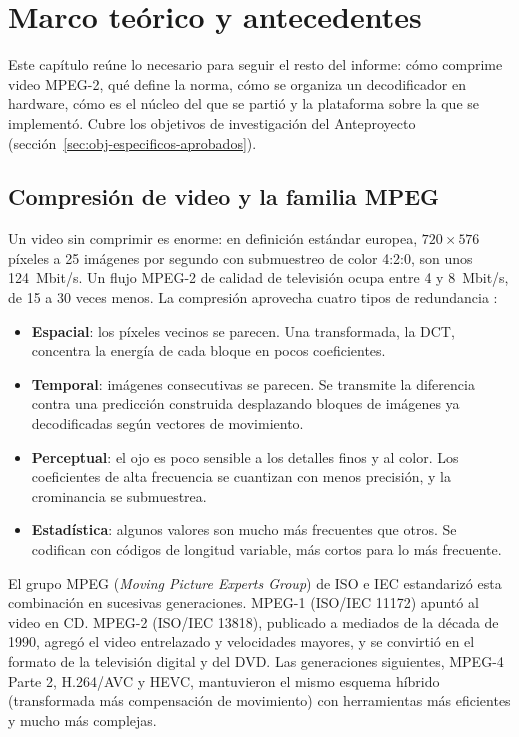 \chapter{Marco teórico y antecedentes}
\label{cap:marco}

Este capítulo reúne lo necesario para seguir el resto del informe: cómo
comprime video MPEG-2, qué define la norma, cómo se organiza un
decodificador en hardware, cómo es el núcleo del que se partió y la
plataforma sobre la que se implementó. Cubre los objetivos de investigación
del Anteproyecto (sección~\ref{sec:obj-especificos-aprobados}).

\section{Compresión de video y la familia MPEG}

Un video sin comprimir es enorme: en definición estándar europea, $720
\times 576$ píxeles a 25 imágenes por segundo con submuestreo de color 4:2:0,
son unos 124~Mbit/s. Un flujo MPEG-2 de calidad de televisión ocupa entre 4 y
8~Mbit/s, de 15 a 30 veces menos. La compresión aprovecha cuatro tipos de
redundancia \citep{Watkinson_2013}:

\begin{itemize}
  \item \textbf{Espacial}: los píxeles vecinos se parecen. Una transformada,
    la DCT, concentra la energía de cada bloque en pocos coeficientes.
  \item \textbf{Temporal}: imágenes consecutivas se parecen. Se transmite la
    diferencia contra una predicción construida desplazando bloques de
    imágenes ya decodificadas según vectores de movimiento.
  \item \textbf{Perceptual}: el ojo es poco sensible a los detalles finos y al
    color. Los coeficientes de alta frecuencia se cuantizan con menos
    precisión, y la crominancia se submuestrea.
  \item \textbf{Estadística}: algunos valores son mucho más frecuentes que
    otros. Se codifican con códigos de longitud variable, más cortos para lo
    más frecuente.
\end{itemize}

El grupo MPEG (\emph{Moving Picture Experts Group}) de ISO e IEC estandarizó
esta combinación en sucesivas generaciones. MPEG-1 (ISO/IEC 11172) apuntó al
video en CD. MPEG-2 (ISO/IEC 13818), publicado a mediados de la década de
1990, agregó el video entrelazado y velocidades mayores, y se convirtió en el
formato de la televisión digital y del DVD. Las generaciones siguientes,
MPEG-4 Parte 2, H.264/AVC y HEVC, mantuvieron el mismo esquema híbrido
(transformada más compensación de movimiento) con herramientas más
eficientes y mucho más complejas.

